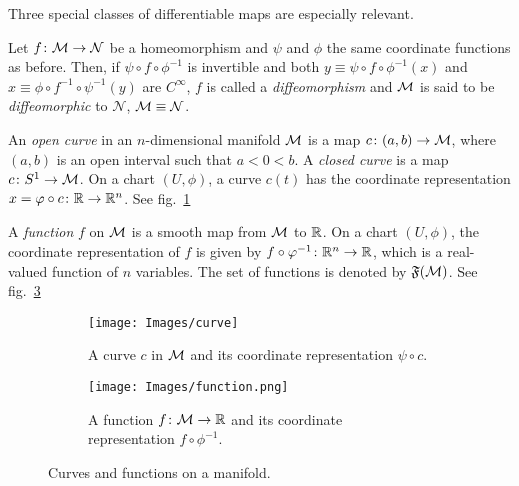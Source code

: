 Three special classes of differentiable maps are especially relevant.

\begin{definition}[Diffeomorphism]
	Let $f \colon \mathcal{M} \to \mathcal{N}$ be a homeomorphism and $\psi$ and $\phi$ the same coordinate functions as before. Then, if $\psi \circ f \circ \phi^{-1}$ is invertible and both $y \equiv \psi \circ f \circ \phi^{-1}(x)$ and $x \equiv \phi \circ f^{-1} \circ \psi^{-1}(y)$ are $C^\infty$, $f$ is called a \emph{diffeomorphism} and $\mathcal{M}$ is said to be \emph{diffeomorphic} to $\mathcal{N}$, $\mathcal{M} \equiv \mathcal{N}$.
\end{definition}

\begin{definition}[Curve]
	An \emph{open curve} in an $n$-dimensional manifold $\mathcal{M}$ is a map $c \colon (a,b) \to \mathcal{M}$, where $(a,b)$ is an open interval such that $a<0<b$. A \emph{closed curve} is a map $c \colon S^1 \to \mathcal{M}$. On a chart $(U,\phi)$, a curve $c(t)$ has the coordinate representation $x=\varphi \circ c \colon \mathbb{R} \to \mathbb{R}^n$. See fig.~\ref{fig:curve}
\end{definition}

\begin{definition}[Function]
	A \emph{function} $f$ on $\mathcal{M}$ is a smooth map from $\mathcal{M}$ to $\mathbb{R}$. On a chart $(U,\phi)$, the coordinate representation of $f$ is given by $f \circ \varphi^{-1} \colon \mathbb{R}^n \to \mathbb{R}$, which is a real-valued function of $n$ variables. The set of functions is denoted by $\mathfrak{F}(\mathcal{M})$. See fig.~\ref{fig:function}
\end{definition}

\begin{figure}
	\centering
	\begin{subfigure}[b]{0.38\textwidth}
		\texttt{[image: Images/curve]}
		\caption{A curve $c$ in $\mathcal{M}$ and its coordinate representation $\psi \circ c$.}
		\label{fig:curve}
	\end{subfigure}
	\hfill
	\begin{subfigure}[b]{0.42\textwidth}
		\texttt{[image: Images/function.png]}
		\caption{A function $f\colon \mathcal{M} \to \mathbb{R}$ and its coordinate representation $f \circ \phi^{-1}$.}
		\label{fig:function}
	\end{subfigure}
	\caption{Curves and functions on a manifold.}
\end{figure}

